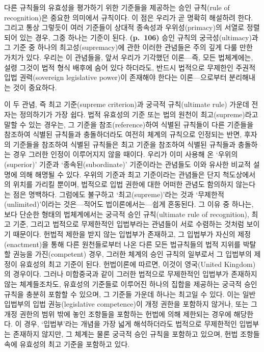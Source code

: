 다른 규칙들의 유효성을 평가하기 위한 기준들을 제공하는 승인 규칙(rule of
recognition)은 중요한 의미에서  규칙이다. 이 점은
우리가 곧 명확히 해설하려 한다. 그리고 통상 그렇듯이 여러 기준들이
상대적 종속성과 우위성(primacy)의 서열로 정렬되어 있는 경우, 그중 하나는
 기준이 된다. \textbf{(p.~106)} 승인 규칙의
궁극성(ultimacy)과 그 기준 중 하나의 최고성(supremacy)에 관한 이러한
관념들은 주의 깊게 다룰 만한 가치가 있다. 우리는 이 관념들을, 앞서
우리가 기각했던 이론---즉, 모든 법체계에는, 설령 그것이 법적 형식 배후에
숨어 있다 하더라도, 반드시 법적으로 무제한인 주권적 입법 권력(sovereign
legislative power)이 존재해야 한다는 이론---으로부터 분리해내는 것이
중요하다.

이 두 관념, 즉 최고 기준(supreme criterion)과 궁극적 규칙(ultimate rule)
가운데 전자는 정의하기가 가장 쉽다. 법적 유효성의 기준 또는 법의 원천이
최고(supreme)라고 말할 수 있는 경우는, 그 기준을 참조(reference)하여
식별된 규칙들이 다른 기준들을 참조하여 식별된 규칙들과 충돌하더라도
여전히 체계의 규칙으로 인정되는 반면, 후자의 기준들을 참조하여 식별된
규칙들은 최고 기준을 참조하여 식별된 규칙들과 충돌하는 경우 그러한
인정이 이루어지지 않을 때이다. 우리가 이미 사용해 온 ‘우위의(superior)’
기준과 ‘종속된(subordinate)’ 기준이라는 관념들도 이와 유사한 비교적
설명에 의해 해명될 수 있다. 우위의 기준과 최고 기준이라는 관념들은 단지
척도상에서의  위치를 가리킬 뿐이며, 법적으로
 입법 권한에 대한 어떠한 관념도 함의하지
않는다는 점은 명백하다. 그럼에도 불구하고 ‘최고(supreme)’라는 것과
‘무제한적(unlimited)’이라는 것은---적어도 법이론에서는---쉽게 혼동된다.
그 이유 중 하나는, 보다 단순한 형태의 법체계에서는 궁극적 승인
규칙(ultimate rule of recognition), 최고 기준, 그리고 법적으로
무제한적인 입법부라는 관념들이 서로 수렴하는 것처럼 보이기 때문이다.
헌법적 제한을 받지 않는 입법부가 존재하고, 그 입법부가 자신의
제정(enactment)을 통해 다른 원천들로부터 나온 다른 모든 법규칙들의 법적
지위를 박탈할 권능을 가진(competent) 경우, 그러한 체계의 승인 규칙의
일부로서 그 입법부의 제정이 유효성의 최고 기준이 된다. 헌법이론에
따르면, 이것이 영국(United Kingdom)의 경우이다. 그러나 미합중국과 같이
그러한 법적으로 무제한적인 입법부가 존재하지 않는 체계들조차도, 유효성의
기준들로 이루어진 하나의 집합을 제공하는 궁극적 승인 규칙을 충분히
포함할 수 있으며, 그 기준들 가운데 하나는 최고일 수 있다. 이는 일반
입법부의 입법 권능(legislative competence)이 개정 권한을 포함하지
않거나, 또는 그 개정 권한의 범위 밖에 놓인 조항들을 포함하는 헌법에 의해
제한되는 경우에 해당한다. 이 경우, ‘입법부’라는 개념을 가장 넓게
해석하더라도 법적으로 무제한적인 입법부는 존재하지 않지만, 그 체계는
물론 궁극적 승인 규칙을 포함하고 있으며, 헌법 조항들 속에 유효성의 최고
기준을 포함하고 있다.

